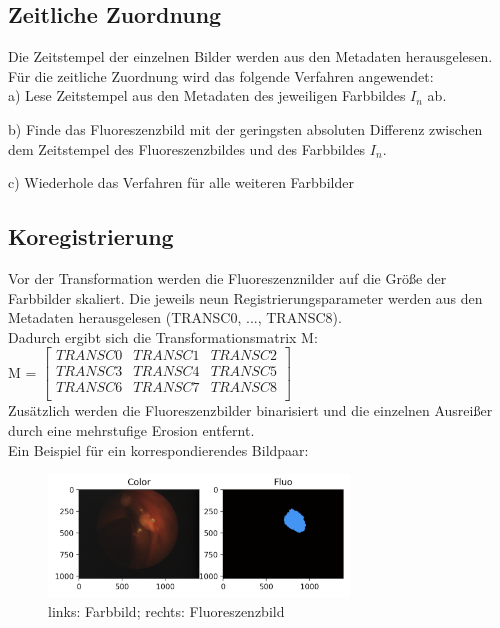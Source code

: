 \documentclass[conference]{IEEEtran}
\begin{document}
\subsection{Zeitliche Zuordnung}
Die Zeitstempel der einzelnen Bilder werden aus den Metadaten herausgelesen. Für die zeitliche Zuordnung wird das folgende Verfahren angewendet: \\

a) Lese Zeitstempel aus den Metadaten des jeweiligen Farbbildes $I_n$ ab.

b) Finde das Fluoreszenzbild mit der geringsten absoluten Differenz zwischen dem Zeitstempel des Fluoreszenzbildes und des Farbbildes $I_n$.

c) Wiederhole das Verfahren für alle weiteren Farbbilder

\subsection{Koregistrierung}
Vor der Transformation werden die Fluoreszenznilder auf die Größe der Farbbilder skaliert.
Die jeweils neun Registrierungsparameter werden aus den Metadaten herausgelesen (TRANSC0, ..., TRANSC8). \\

Dadurch ergibt sich die Transformationsmatrix M: \\

M = 
$\begin{bmatrix}
 TRANSC0 & TRANSC1 & TRANSC2 \\
 TRANSC3 & TRANSC4 & TRANSC5 \\
 TRANSC6 & TRANSC7 & TRANSC8 \\
\end{bmatrix}$ \\

Zusätzlich werden die Fluoreszenzbilder binarisiert und die einzelnen Ausreißer durch eine mehrstufige Erosion entfernt. \\

Ein Beispiel für ein korrespondierendes Bildpaar:

\begin{figure}[h]
\includegraphics[width=8cm]{Fig1}
\caption{links: Farbbild; rechts: Fluoreszenzbild}
\end{figure}
\end{document}
